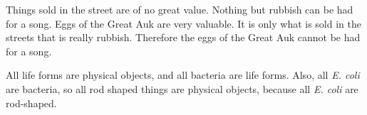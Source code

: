 \begin{exercises}
\item \label{itm:Auk} Things sold in the street are of no great value. Nothing but rubbish can be had for a song. Eggs of the Great Auk are very valuable. It is only what is sold in the streets that is really rubbish. Therefore the eggs of the Great Auk cannot be had for a song.




\item All life forms are physical objects, and all bacteria are life forms. Also, all \textit{E. coli} are bacteria, so all rod shaped things are physical objects, because all \textit{E. coli} are rod-shaped.







\end{exercises}
